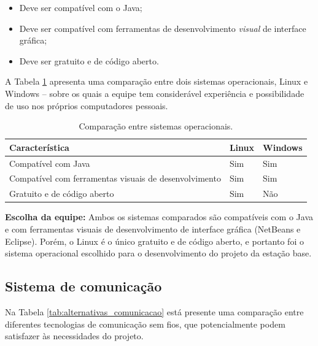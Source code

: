 \begin{itemize}
  \item Deve ser compatível com o Java;
  \item Deve ser compatível com ferramentas de desenvolvimento \textit{visual} de interface gráfica;
  \item Deve ser gratuito e de código aberto.
\end{itemize}

A Tabela \ref{tab:alternativas_SO} apresenta uma comparação entre dois sistemas operacionais, Linux e Windows -- sobre os quais a equipe tem considerável experiência e possibilidade de uso nos próprios computadores pessoais.

\begin{table}[h]
  \caption{Comparação entre sistemas operacionais.}
  \centering
  \begin{tabular}{p{6cm}|p{2cm}p{2cm}}
    \toprule
    \textbf{Característica} & \textbf{Linux} & \textbf{Windows} \\
    \hline
    Compatível com Java & Sim & Sim \\
    \hline
    Compatível com ferramentas visuais de desenvolvimento & Sim & Sim \\
    \hline
    Gratuito e de código aberto & Sim & Não \\
    \bottomrule
  \end{tabular}
  \label{tab:alternativas_SO}
\end{table}

\textbf{Escolha da equipe:} Ambos os sistemas comparados são compatíveis com o Java e com ferramentas visuais de desenvolvimento de interface gráfica (NetBeans e Eclipse). Porém, o Linux é o único gratuito e de código aberto, e portanto foi o sistema operacional escolhido para o desenvolvimento do projeto da estação base.



\subsection{Sistema de comunicação}

Na Tabela \ref{tab:alternativas_comunicacao} está presente uma comparação entre diferentes tecnologias de comunicação sem fios, que potencialmente podem satisfazer às necessidades do projeto. 


